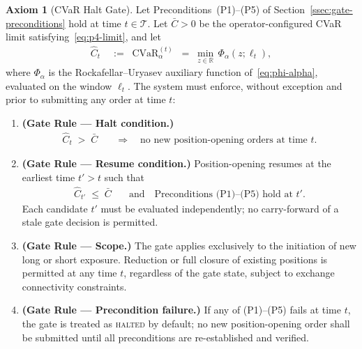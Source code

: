 \documentclass[12pt,openany]{book}
\numberwithin{equation}{chapter}
\theoremstyle{plain}
\theoremstyle{definition}
\newtheorem{axiom}[theorem]{Axiom}
\theoremstyle{remark}
\numberwithin{equation}{chapter}
\theoremstyle{plain}
\DeclareMathOperator{\CVaR}{CVaR}
\begin{document}
\begin{axiom}[CVaR Halt Gate]
\label{ax:cvar-gate}
Let Preconditions~(P1)--(P5) of Section~\ref{ssec:gate-preconditions}
hold at time $t \in \mathcal{T}$.  Let $\bar{C} > 0$ be the
operator-configured CVaR limit satisfying~\eqref{eq:p4-limit}, and
let
\begin{align}
  \hat{C}_t \;&:=\; \CVaR_\alpha^{(t)}
    \;=\; \min_{z\in\mathbb{R}}\,\Phi_\alpha(z;\boldsymbol{\ell}_t),
    \label{eq:gate-cvar-def}
\end{align}
where $\Phi_\alpha$ is the Rockafellar--Uryasev auxiliary function
of~\eqref{eq:phi-alpha}, evaluated on the window
$\boldsymbol{\ell}_t$.  The system must enforce, without exception
and prior to submitting any order at time $t$:
\begin{enumerate}
  \item \textbf{(Gate Rule --- Halt condition.)}
        \begin{align}
          \hat{C}_t \;>\; \bar{C}
            \quad&\Longrightarrow\quad
            \text{no new position-opening orders at time } t.
            \label{eq:cvar-gate-rule}
        \end{align}

  \item \textbf{(Gate Rule --- Resume condition.)}
        Position-opening resumes at the earliest time $t' > t$ such
        that
        \begin{align}
          \hat{C}_{t'} \;\leq\; \bar{C}
            \quad&\text{and}\quad
            \text{Preconditions~(P1)--(P5) hold at } t'.
            \label{eq:cvar-gate-resume}
        \end{align}
        Each candidate $t'$ must be evaluated independently;
        no carry-forward of a stale gate decision is permitted.

  \item \textbf{(Gate Rule --- Scope.)}
        The gate applies exclusively to the initiation of new long or
        short exposure.  Reduction or full closure of existing
        positions is permitted at any time $t$, regardless of the
        gate state, subject to exchange connectivity constraints.

  \item \textbf{(Gate Rule --- Precondition failure.)}
        If any of (P1)--(P5) fails at time $t$, the gate is treated
        as \textsc{halted} by default; no new position-opening order
        shall be submitted until all preconditions are re-established
        and verified.
\end{enumerate}
\end{axiom}
\end{document}

